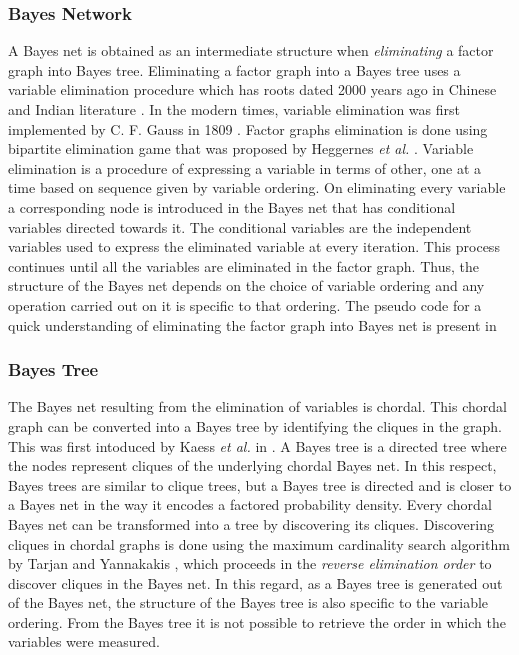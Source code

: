 \subsubsection{Bayes Network}
A Bayes net is obtained as an intermediate structure when \textit{eliminating} a factor graph into Bayes tree. Eliminating a factor graph into a Bayes tree uses a variable elimination procedure which has roots dated 2000 years ago in Chinese and Indian literature \cite{oldchina}. In the modern times, variable elimination was first implemented by C. F. Gauss in 1809 \cite{gauss}. Factor graphs elimination is done using bipartite elimination game that was proposed by Heggernes \textit{et al.} \cite{heggernesordering}. Variable elimination is a procedure of expressing a variable in terms of other, one at a time based on sequence given by variable ordering. On eliminating every variable a corresponding node is introduced in the Bayes net that has conditional variables directed towards it. The conditional variables are the independent variables used to express the eliminated variable at every iteration. This process continues until all the variables are eliminated in the factor graph. Thus, the structure of the Bayes net depends on the choice of variable ordering and any operation carried out on it is specific to that ordering. The pseudo code for a quick understanding of eliminating the factor graph into Bayes net is present in \cite{kaessbayestree}
\label{sss:bayes_net_intro}

\subsubsection{Bayes Tree}
The Bayes net resulting from the elimination of variables is chordal. This chordal graph can be converted into a Bayes tree by identifying the cliques in the graph. This was first intoduced by Kaess \textit{et al.} in \cite{kaessbayestree}. A Bayes tree is a directed tree where the nodes represent cliques of the underlying chordal Bayes net. In this respect, Bayes trees are similar to clique trees, but a Bayes tree is directed and is closer to a Bayes net in the way it encodes a factored probability density. Every chordal Bayes net can be transformed into a tree by discovering its cliques. Discovering cliques in chordal graphs is done using the maximum cardinality search algorithm by Tarjan and Yannakakis \cite{fgtobn}, which proceeds in the \textit{reverse elimination order} to discover cliques in the Bayes net. In this regard, as a Bayes tree is generated out of the Bayes net, the structure of the Bayes tree is also specific to the variable ordering. From the Bayes tree it is not possible to retrieve the order in which the variables were measured. 

